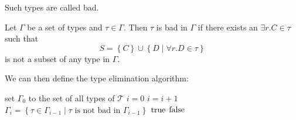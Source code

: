 Such types are called bad.

\begin{definition}
	Let $\Gamma$ be a set of types and $\tau \in \Gamma$.
	Then $\tau$ is bad in $\Gamma$ if there exists an $\exists r.C \in \tau$ such that
	\[
		S = \left\{ C \right\} \cup \left\{ D \mid \forall r.D \in \tau \right\}
	\]
	is not a subset of any type in $\Gamma$.
\end{definition}

We can then define the type elimination algorithm:
\begin{algorithm}[H]
	\caption{$\mathcal{ALC}\func{-Elim}(A_0, \mathcal{T})$}
	\begin{algorithmic}[1]
		\State set $\Gamma_0$ to the set of all types of $\mathcal{T}$
		\State $i = 0$
		\Repeat
		\State $i = i + 1$
		\State $\Gamma_i = \left\{ \tau \in \Gamma_{i-1} \mid \tau \text{ is not bad in } \Gamma_{i-1} \right\}$
		\Return $\mathit{\text{true}}$
		\Else{}
		\Return $\mathit{\text{false}}$
		\EndIf
	\end{algorithmic}
\end{algorithm}

